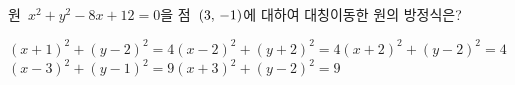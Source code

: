 원~$x^2+y^2-8x+12=0$을 점~$(3,\mkern3mu -1)$에 대하여 대칭이동한 원의 방정식은?
\begin{choicesv}{$(x+1)^2+(y-2)^2=4$}{$(x-2)^2+(y+2)^2=4$}{$(x+2)^2+(y-2)^2=4$}{$(x-3)^2+(y-1)^2=9$}{$(x+3)^2+(y-2)^2=9$}\end{choicesv}
